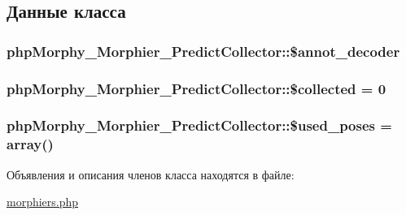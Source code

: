 \subsection{Данные класса}
\hypertarget{classphpMorphy__Morphier__PredictCollector_a2736fca13aacb2d6f3d7ed2acb63554e}{
\subsubsection[{\$annot\_\-decoder}]{\setlength{\rightskip}{0pt plus 5cm}phpMorphy\_\-Morphier\_\-PredictCollector::\$annot\_\-decoder}}
\label{classphpMorphy__Morphier__PredictCollector_a2736fca13aacb2d6f3d7ed2acb63554e}
\hypertarget{classphpMorphy__Morphier__PredictCollector_a04ce1567c2ee6574c150847b4d68af84}{
\subsubsection[{\$collected}]{\setlength{\rightskip}{0pt plus 5cm}phpMorphy\_\-Morphier\_\-PredictCollector::\$collected = 0}}
\label{classphpMorphy__Morphier__PredictCollector_a04ce1567c2ee6574c150847b4d68af84}
\hypertarget{classphpMorphy__Morphier__PredictCollector_a13da18ecdc4bbb28c020a2a9d7e27c22}{
\subsubsection[{\$used\_\-poses}]{\setlength{\rightskip}{0pt plus 5cm}phpMorphy\_\-Morphier\_\-PredictCollector::\$used\_\-poses = array()}}
\label{classphpMorphy__Morphier__PredictCollector_a13da18ecdc4bbb28c020a2a9d7e27c22}


Объявления и описания членов класса находятся в файле:\begin{DoxyCompactItemize}
\item 
\hyperlink{morphiers_8php}{morphiers.php}\end{DoxyCompactItemize}
